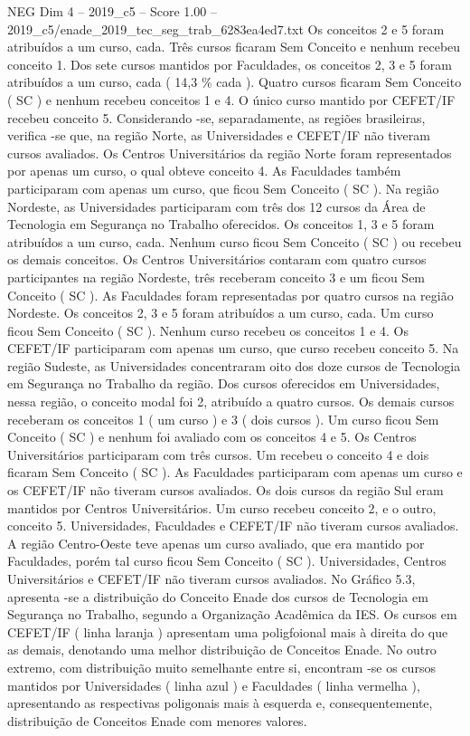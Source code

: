 \begin{textsample}{NEG Dim 4 – 2019\_c5 – Score 1.00 – 2019\_c5/enade\_2019\_tec\_seg\_trab\_6283ea4ed7.txt}
Os conceitos 2 e 5 foram atribuídos a um curso, cada.
Três cursos ficaram Sem Conceito e nenhum recebeu conceito 1.
Dos sete cursos mantidos por Faculdades, os conceitos 2, 3 e 5 foram atribuídos a um curso, cada ( 14,3 \% cada ).
Quatro cursos ficaram Sem Conceito ( SC ) e nenhum recebeu conceitos 1 e 4.
O único curso mantido por CEFET/IF recebeu conceito 5.
Considerando -se, separadamente, as regiões brasileiras, verifica -se que, na região Norte, as Universidades e CEFET/IF não tiveram cursos avaliados.
Os Centros Universitários da região Norte foram representados por apenas um curso, o qual obteve conceito 4.
As Faculdades também participaram com apenas um curso, que ficou Sem Conceito ( SC ).
Na região Nordeste, as Universidades participaram com três dos 12 cursos da Área de Tecnologia em Segurança no Trabalho oferecidos.
Os conceitos 1, 3 e 5 foram atribuídos a um curso, cada.
Nenhum curso ficou Sem Conceito ( SC ) ou recebeu os demais conceitos.
Os Centros Universitários contaram com quatro cursos participantes na região Nordeste, três receberam conceito 3 e um ficou Sem Conceito ( SC ).
As Faculdades foram representadas por quatro cursos na região Nordeste.
Os conceitos 2, 3 e 5 foram atribuídos a um curso, cada.
Um curso ficou Sem Conceito ( SC ).
Nenhum curso recebeu os conceitos 1 e 4.
Os CEFET/IF participaram com apenas um curso, que curso recebeu conceito 5.
Na região Sudeste, as Universidades concentraram oito dos doze cursos de Tecnologia em Segurança no Trabalho da região.
Dos cursos oferecidos em Universidades, nessa região, o conceito modal foi 2, atribuído a quatro cursos.
Os demais cursos receberam os conceitos 1 ( um curso ) e 3 ( dois cursos ).
Um curso ficou Sem Conceito ( SC ) e nenhum foi avaliado com os conceitos 4 e 5.
Os Centros Universitários participaram com três cursos.
Um recebeu o conceito 4 e dois ficaram Sem Conceito ( SC ).
As Faculdades participaram com apenas um curso e os CEFET/IF não tiveram cursos avaliados.
Os dois cursos da região Sul eram mantidos por Centros Universitários.
Um curso recebeu conceito 2, e o outro, conceito 5.
Universidades, Faculdades e CEFET/IF não tiveram cursos avaliados.
A região Centro-Oeste teve apenas um curso avaliado, que era mantido por Faculdades, porém tal curso ficou Sem Conceito ( SC ).
Universidades, Centros Universitários e CEFET/IF não tiveram cursos avaliados.
No Gráfico 5.3, apresenta -se a distribuição do Conceito Enade dos cursos de Tecnologia em Segurança no Trabalho, segundo a Organização Acadêmica da IES.
Os cursos em CEFET/IF ( linha laranja ) apresentam uma poligfoional mais à direita do que as demais, denotando uma melhor distribuição de Conceitos Enade.
No outro extremo, com distribuição muito semelhante entre si, encontram -se os cursos mantidos por Universidades ( linha azul ) e Faculdades ( linha vermelha ), apresentando as respectivas poligonais mais à esquerda e, consequentemente, distribuição de Conceitos Enade com menores valores.

\end{textsample}
